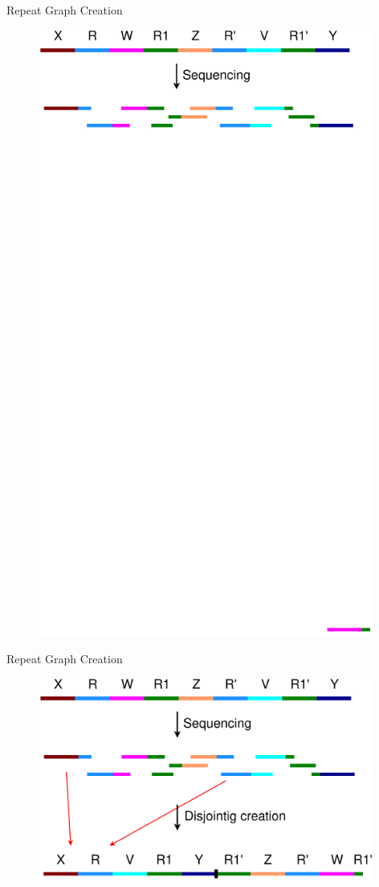 \documentclass{beamer}
\begin{document}
  \begin{frame}{Repeat Graph Creation}
    \begin{figure}
      \includegraphics[width=11cm]{presentation/images/genome.png}
      \label{fig:genome_and_reads}
    \end{figure}
  \end{frame}

  \begin{frame}{Repeat Graph Creation}
    \begin{figure}
      \includegraphics[width=11cm]{presentation/images/disjointigs.png}
      \label{fig:disjointigs}
    \end{figure}
  \end{frame}
\end{document}
